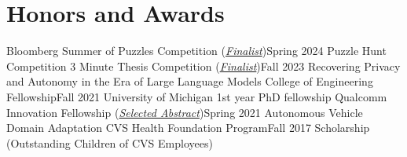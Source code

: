 \section{Honors and Awards}
  \CVSubHeadingListStart
    \CVSubheading
      {Bloomberg Summer of Puzzles Competition (\underline{\textit{Finalist}})}{Spring 2024}
      {Puzzle Hunt Competition}{}
    \CVSubheading
      {3 Minute Thesis Competition (\underline{\textit{Finalist}})}{Fall 2023}
      {Recovering Privacy and Autonomy in the Era of Large Language Models}{}
    \CVSubheading
      {College of Engineering Fellowship}{Fall 2021}
      {University of Michigan 1st year PhD fellowship}{}
    \CVSubheading
      {Qualcomm Innovation Fellowship (\underline{\textit{Selected Abstract}})}{Spring 2021}
      {Autonomous Vehicle Domain Adaptation}{}
    \CVSubheading
      {CVS Health Foundation Program}{Fall 2017}
      {Scholarship (Outstanding Children of CVS Employees)}{}
  \CVSubHeadingListEnd